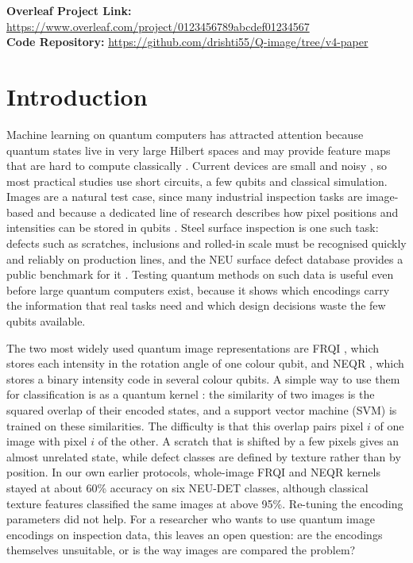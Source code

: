 \documentclass[12pt,onecolumn,draftclsnofoot]{IEEEtran}
\begin{document}
\noindent\textbf{Overleaf Project Link:} \url{https://www.overleaf.com/project/0123456789abcdef01234567}\\
\noindent\textbf{Code Repository:} \url{https://github.com/drishti55/Q-image/tree/v4-paper}

\section{Introduction}
Machine learning on quantum computers has attracted attention because quantum states live in very large Hilbert spaces and may provide feature maps that are hard to compute classically \cite{biamonte2017,havlicek2019}. Current devices are small and noisy \cite{preskill2018}, so most practical studies use short circuits, a few qubits and classical simulation. Images are a natural test case, since many industrial inspection tasks are image-based and because a dedicated line of research describes how pixel positions and intensities can be stored in qubits \cite{yan2016survey}. Steel surface inspection is one such task: defects such as scratches, inclusions and rolled-in scale must be recognised quickly and reliably on production lines, and the NEU surface defect database provides a public benchmark for it \cite{song2013neu,he2020neudet}. Testing quantum methods on such data is useful even before large quantum computers exist, because it shows which encodings carry the information that real tasks need and which design decisions waste the few qubits available.

The two most widely used quantum image representations are FRQI \cite{le2011frqi}, which stores each intensity in the rotation angle of one colour qubit, and NEQR \cite{zhang2013neqr}, which stores a binary intensity code in several colour qubits. A simple way to use them for classification is as a quantum kernel \cite{schuld2019feature,havlicek2019}: the similarity of two images is the squared overlap of their encoded states, and a support vector machine (SVM) \cite{cortes1995} is trained on these similarities. The difficulty is that this overlap pairs pixel $i$ of one image with pixel $i$ of the other. A scratch that is shifted by a few pixels gives an almost unrelated state, while defect classes are defined by texture rather than by position. In our own earlier protocols, whole-image FRQI and NEQR kernels stayed at about 60\% accuracy on six NEU-DET classes, although classical texture features classified the same images at above 95\%. Re-tuning the encoding parameters did not help. For a researcher who wants to use quantum image encodings on inspection data, this leaves an open question: are the encodings themselves unsuitable, or is the way images are compared the problem?
\end{document}
